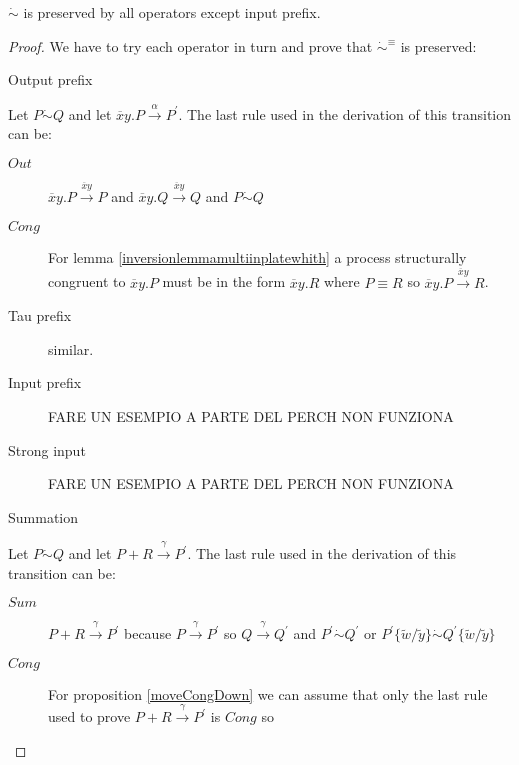 \begin{proposition}
  $\dot{\sim}$ is preserved by all operators except input prefix.
  \begin{proof}
    We have to try each operator in turn and prove that $\dot{\sim}^{\equiv}$ is preserved:
    \begin{description}
      \item[Output prefix]
    \end{description}
	Let $P \dot{\sim} Q$ and let $\overline{x}y.P \xrightarrow{\alpha} P^{'}$. The last rule used in the derivation of this transition can be:
	\begin{description}
	  \item[$Out$]
	    $\overline{x}y.P \xrightarrow{\overline{x}y} P$ and $\overline{x}y.Q \xrightarrow{\overline{x}y} Q$ and $P \dot{\sim} Q$
	  \item[$Cong$]
	    For lemma \ref{inversionlemmamultiinplatewhith} a process structurally congruent to $\overline{x}y.P$ must be in the form $\overline{x}y.R$ where $P \equiv R$ so $\overline{x}y.P \xrightarrow{\overline{x}y} R$.
	\end{description}
    \begin{description}
      \item[Tau prefix] similar.
    \end{description}
    \begin{description}
      \item[Input prefix] FARE UN ESEMPIO A PARTE DEL PERCH NON FUNZIONA
    \end{description}
    \begin{description}
      \item[Strong input] FARE UN ESEMPIO A PARTE DEL PERCH NON FUNZIONA	
    \end{description}
    \begin{description}
      \item[Summation]
    \end{description}
	Let $P \dot{\sim} Q$ and let $P+R \xrightarrow{\gamma} P^{'}$. The last rule used in the derivation of this transition can be:
	\begin{description}
	  \item[$Sum$]
	    $P+R \xrightarrow{\gamma} P^{'}$ because $P \xrightarrow{\gamma} P^{'}$ so $Q \xrightarrow{\gamma} Q^{'}$ and $P^{'} \dot{\sim} Q^{'}$ or $P^{'}\{\tilde{w}/\tilde{y}\} \dot{\sim} Q^{'}\{\tilde{w}/\tilde{y}\}$
	  \item[$Cong$]
	    For proposition \ref{moveCongDown} we can assume that only the last rule used to prove $P+R \xrightarrow{\gamma} P^{'}$ is $Cong$ so

\end{description}
\end{proof}
\end{proposition}
